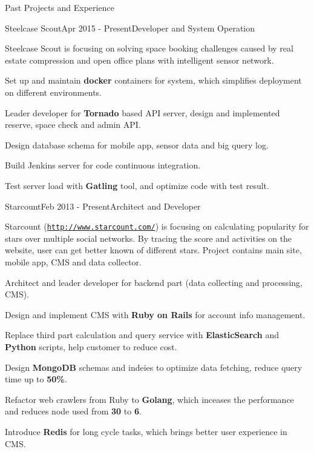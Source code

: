 \documentclass{resume} %
\newcommand{\http}{http:/\hspace{-0.3ex}/}
\begin{document}
\begin{rSection}{Past Projects and Experience}


\begin{rSubsection}{Steelcase Scout}{Apr 2015 - Present}{Developer and System Operation}{}

Steelcase Scout is focusing on solving space booking challenges caused by real estate compression and open office plans with intelligent sensor network.

\begin{rSubsectionList}
\item Set up and maintain \textbf{docker} containers for system, which simplifies deployment on different environments.
\item Leader developer for \textbf{Tornado} based API server, design and implemented reserve, space check and admin API.
\item Design database schema for mobile app, sensor data and big query log.
\item Build Jenkins server for code continuous integration.
\item Test server load with \textbf{Gatling} tool, and optimize code with test result.
\end{rSubsectionList}
\end{rSubsection}

\begin{rSubsection}{Starcount}{Feb 2013 - Present}{Architect and Developer}{}

Starcount (\href{http://www.starcount.com/}{\tt \http{}www.starcount.com/}) is focusing on calculating popularity for stars over multiple social networks. By tracing the score and activities on the website, user can get better known of different stars. Project contains main site, mobile app, CMS and data collector.

\begin{rSubsectionList}
\item Architect and leader developer for backend part (data collecting and processing, CMS).
\item Design and implement CMS with \textbf{Ruby on Rails} for account info management.
\item Replace third part calculation and query service with \textbf{ElasticSearch} and \textbf{Python} scripts, help customer to reduce cost.
\item Design \textbf{MongoDB} schemas and indeies to optimize data fetching, reduce query time up to \textbf{50\%}.
\item Refactor web crawlers from Ruby to \textbf{Golang}, which inceases the performance and reduces node used from \textbf{30} to \textbf{6}.
\item Introduce \textbf{Redis} for long cycle tasks, which brings better user experience in CMS.
\end{rSubsectionList}
\end{rSubsection}




\end{rSection}
\end{document}
